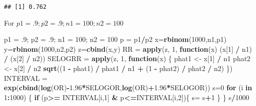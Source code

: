 \documentclass[]{article}
\newenvironment{Shaded}{\begin{snugshade}}{\end{snugshade}}
\newcommand{\KeywordTok}[1]{\textcolor[rgb]{0.13,0.29,0.53}{\textbf{#1}}}
\newcommand{\DecValTok}[1]{\textcolor[rgb]{0.00,0.00,0.81}{#1}}
\newcommand{\FloatTok}[1]{\textcolor[rgb]{0.00,0.00,0.81}{#1}}
\newcommand{\StringTok}[1]{\textcolor[rgb]{0.31,0.60,0.02}{#1}}
\newcommand{\ControlFlowTok}[1]{\textcolor[rgb]{0.13,0.29,0.53}{\textbf{#1}}}
\newcommand{\OperatorTok}[1]{\textcolor[rgb]{0.81,0.36,0.00}{\textbf{#1}}}
\newcommand{\NormalTok}[1]{#1}
\begin{document}
\begin{verbatim}
## [1] 0.762
\end{verbatim}

For \(p1 = .9; p2 = .9; n1 = 100; n2 = 100\)

\begin{Shaded}
\begin{Highlighting}[]
\NormalTok{p1 =}\StringTok{ }\NormalTok{.}\DecValTok{9}\NormalTok{; p2 =}\StringTok{ }\NormalTok{.}\DecValTok{9}\NormalTok{; n1 =}\StringTok{ }\DecValTok{100}\NormalTok{; n2 =}\StringTok{ }\DecValTok{100}
\NormalTok{p =}\StringTok{ }\NormalTok{p1}\OperatorTok{/}\NormalTok{p2}
\NormalTok{x=}\KeywordTok{rbinom}\NormalTok{(}\DecValTok{1000}\NormalTok{,n1,p1)}
\NormalTok{y=}\KeywordTok{rbinom}\NormalTok{(}\DecValTok{1000}\NormalTok{,n2,p2)}
\NormalTok{z=}\KeywordTok{cbind}\NormalTok{(x,y)}
\NormalTok{RR =}\StringTok{ }\KeywordTok{apply}\NormalTok{(z, }\DecValTok{1}\NormalTok{,}
\ControlFlowTok{function}\NormalTok{(x) (x[}\DecValTok{1}\NormalTok{] }\OperatorTok{/}\StringTok{ }\NormalTok{n1) }\OperatorTok{/}\StringTok{ }\NormalTok{(x[}\DecValTok{2}\NormalTok{] }\OperatorTok{/}\StringTok{ }\NormalTok{n2))}
\NormalTok{SELOGRR =}\StringTok{ }\KeywordTok{apply}\NormalTok{(z, }\DecValTok{1}\NormalTok{,}
\ControlFlowTok{function}\NormalTok{(x) \{}
\NormalTok{phat1 <-}\StringTok{ }\NormalTok{x[}\DecValTok{1}\NormalTok{] }\OperatorTok{/}\StringTok{ }\NormalTok{n1}
\NormalTok{phat2 <-}\StringTok{ }\NormalTok{x[}\DecValTok{2}\NormalTok{] }\OperatorTok{/}\StringTok{ }\NormalTok{n2}
\KeywordTok{sqrt}\NormalTok{((}\DecValTok{1} \OperatorTok{-}\StringTok{ }\NormalTok{phat1) }\OperatorTok{/}\StringTok{ }\NormalTok{phat1 }\OperatorTok{/}\StringTok{ }\NormalTok{n1 }\OperatorTok{+}\StringTok{ }\NormalTok{(}\DecValTok{1} \OperatorTok{-}\StringTok{ }\NormalTok{phat2) }\OperatorTok{/}\StringTok{ }\NormalTok{phat2 }\OperatorTok{/}\StringTok{ }\NormalTok{n2)}
\NormalTok{\})}
\NormalTok{INTERVAL =}\StringTok{ }\KeywordTok{exp}\NormalTok{(}\KeywordTok{cbind}\NormalTok{(}\KeywordTok{log}\NormalTok{(OR)}\OperatorTok{-}\FloatTok{1.96}\OperatorTok{*}\NormalTok{SELOGOR,}\KeywordTok{log}\NormalTok{(OR)}\OperatorTok{+}\FloatTok{1.96}\OperatorTok{*}\NormalTok{SELOGOR))}
\NormalTok{s=}\DecValTok{0}
\ControlFlowTok{for}\NormalTok{ (i }\ControlFlowTok{in} \DecValTok{1}\OperatorTok{:}\DecValTok{1000}\NormalTok{) \{}
  \ControlFlowTok{if}\NormalTok{ (p}\OperatorTok{>=}\StringTok{ }\NormalTok{INTERVAL[i,}\DecValTok{1}\NormalTok{] }\OperatorTok{&}\StringTok{ }\NormalTok{p}\OperatorTok{<=}\NormalTok{INTERVAL[i,}\DecValTok{2}\NormalTok{])\{}
\NormalTok{    s=}\StringTok{ }\NormalTok{s}\OperatorTok{+}\DecValTok{1}
\NormalTok{  \}}
\NormalTok{\}}
\NormalTok{s}\OperatorTok{/}\DecValTok{1000}
\end{Highlighting}
\end{Shaded}
\end{document}
